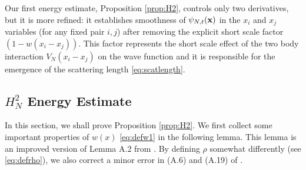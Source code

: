 \documentclass[11pt]{article}
\newcommand{\bx}{{\bf x}}
\begin{document}
Our first energy estimate, Proposition \ref{prop:H2}, controls only
two derivatives, but it is more refined: it establishes smoothness
of $\psi_{N,t}(\bx)$ in the $x_i$ and $x_j$ variables (for any fixed
pair $i,j$) after removing the explicit short scale factor
$(1-w(x_i-x_j))$. This factor represents the short scale effect of
the two body interaction $V_N(x_i-x_j)$ on the wave function and it
is responsible for the emergence of the scattering length
\eqref{eq:scatlength}.




\subsection{$H_N^2$ Energy Estimate}

In this section, we shall prove Proposition \ref{prop:H2}. We first
collect some important properties of $w(x)$ \eqref{eq:defw1} in the
following lemma. This lemma is an improved version of Lemma A.2 from
\cite{ESY}. By defining $\rho$ somewhat differently (see
\eqref{eq:defrho}), we also correct a minor error in (A.6) and
(A.19) of \cite{ESY}.
\end{document}
